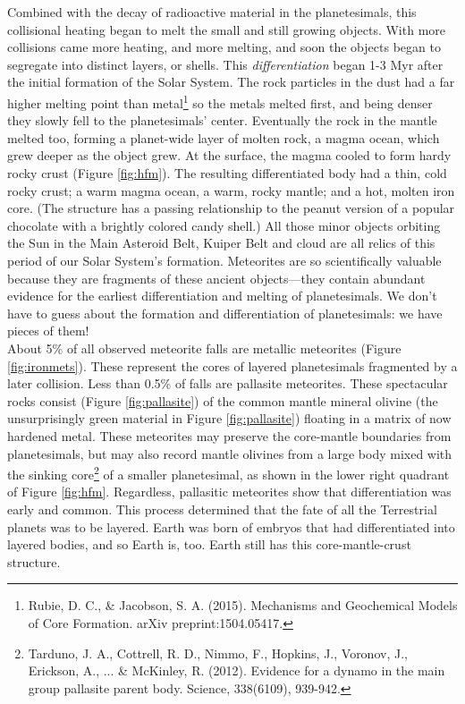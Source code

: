 \documentclass[amstex,12pt]{book}
\begin{document}
Combined with the decay of radioactive material in the planetesimals, this collisional heating began to melt the small and still growing objects. With more collisions came more heating, and more melting, and soon the objects began to segregate into distinct layers, or shells. This \emph{differentiation} began 1-3 Myr after the initial formation of the Solar System. The rock particles in the dust had a far higher melting point than metal\footnote{Rubie, D. C., \& Jacobson, S. A. (2015). Mechanisms and Geochemical Models of Core Formation. arXiv preprint:1504.05417.} so the metals melted first, and being denser they slowly fell to the planetesimals' center. Eventually the rock in the mantle melted too, forming a planet-wide layer of molten rock, a magma ocean, which grew deeper as the object grew. At the surface, the magma cooled to form hardy rocky crust (Figure \ref{fig:hfm}). The resulting differentiated body had a thin, cold rocky crust; a warm magma ocean, a warm, rocky mantle; and a hot, molten iron core. (The structure has a passing relationship to the peanut version of a popular chocolate with a brightly colored candy shell.) All those minor objects orbiting the Sun in the Main Asteroid Belt, Kuiper Belt and  cloud are all relics of this period of our Solar System's formation. Meteorites are so scientifically valuable because they are fragments of these ancient objects---they contain abundant evidence for the earliest differentiation and melting of planetesimals. We don't have to guess about the formation and differentiation of planetesimals: we have pieces of them!\\

About 5\% of all observed meteorite falls are metallic meteorites (Figure \ref{fig:ironmets}). These represent the cores of layered planetesimals fragmented by a later collision. Less than 0.5\% of falls are pallasite meteorites. These spectacular rocks consist (Figure \ref{fig:pallasite}) of the common mantle mineral olivine (the unsurprisingly green material in Figure \ref{fig:pallasite}) floating in a matrix of now hardened metal. These meteorites may preserve the core-mantle boundaries from planetesimals, but may also record mantle olivines from a large body mixed with the sinking core\footnote{Tarduno, J. A., Cottrell, R. D., Nimmo, F., Hopkins, J., Voronov, J., Erickson, A., ... \& McKinley, R. (2012). Evidence for a dynamo in the main group pallasite parent body. Science, 338(6109), 939-942.} of a smaller planetesimal, as shown in the lower right quadrant of Figure \ref{fig:hfm}. Regardless, pallasitic meteorites show that differentiation was early and common. This process determined that the fate of all the Terrestrial planets was to be layered. Earth was born of embryos that had differentiated into layered bodies, and so Earth is, too. Earth still has this core-mantle-crust structure.
\end{document}
